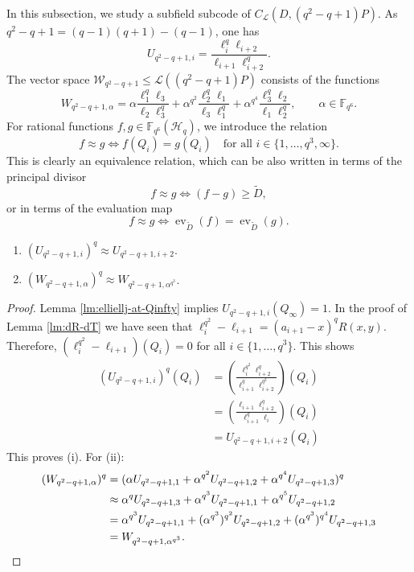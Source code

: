 \documentclass[entropy,article,submit,pdftex,moreauthors]{Definitions/mdpi}
\DeclareMathOperator{\ev}{ev}
\begin{document}
In this subsection, we study a subfield subcode of $C_\mathcal{L}(D,(q^2-q+1)P)$. As $q^2-q+1=(q-1)(q+1)-(q-1)$, one has
\[U_{q^2-q+1,i} = \frac{\ell_i^q\ell_{i+2}}{\ell_{i+1}\ell_{i+2}^q}.\]
The vector space $\mathcal{W}_{q^2-q+1}\leq \mathscr{L}((q^2-q+1)P)$ consists of the functions
\[W_{q^2-q+1,\alpha} = \alpha \frac{\ell_1^q\ell_3}{\ell_2\ell_3^q} + \alpha^{q^2} \frac{\ell_2^q\ell_1}{\ell_3\ell_1^q} + \alpha^{q^4} \frac{\ell_3^q\ell_2}{\ell_1\ell_2^q}, \qquad \alpha \in \mathbb{F}_{q^6}.\]
For rational functions $f,g\in \mathbb{F}_{q^6}(\mathscr{H}_q)$, we introduce the relation
\[f\approx g \Longleftrightarrow f(Q_i)=g(Q_i) \quad \text{for all $i \in \{1,\ldots,q^3,\infty\}$.}\]
This is clearly an equivalence relation, which can be also written in terms of the principal divisor
\[f\approx g \Longleftrightarrow (f-g) \geq \widetilde{D},\]
or in terms of the evaluation map
\[f\approx g \Longleftrightarrow \ev_{\widetilde{D}}(f) = \ev_{\widetilde{D}}(g).\]

\begin{Lemma} \label{lm:Uq-Wq}
\begin{enumerate}[label=(\roman*)]
\item $(U_{q^2-q+1,i})^q \approx U_{q^2-q+1,i+2}$.
\item $(W_{q^2-q+1,\alpha})^q \approx W_{q^2-q+1,\alpha^{q^3}}$.
\end{enumerate}
\end{Lemma}
\begin{proof}
Lemma \ref{lm:elliellj-at-Qinfty} implies $U_{q^2-q+1,i}(Q_\infty)=1$. In the proof of Lemma \ref{lm:dR-dT} we have seen that $\ell_i^{q^2} - \ell_{i+1}=(a_{i+1}-x)^qR(x,y)$. Therefore, $(\ell_i^{q^2} - \ell_{i+1})(Q_i)=0$ for all $i\in \{1,\ldots,q^3\}$. This shows 
\begin{align*}
(U_{q^2-q+1,i})^q(Q_i) &= \left(\frac{\ell_i^{q^2}\ell_{i+2}^q}{\ell_{i+1}^q\ell_{i+2}^{q^2}}\right)(Q_i)\\
&=\left(\frac{\ell_{i+1}\ell_{i+2}^q}{\ell_{i+1}^q\ell_{i}}\right)(Q_i)\\
&=U_{q^2-q+1,i+2}(Q_i)
\end{align*}
This proves (i). For (ii):
\begin{align*}
(W_{q^2-q+1,\alpha})^q &= (\alpha U_{q^2-q+1,1} + \alpha^{q^2} U_{q^2-q+1,2} + \alpha^{q^4} U_{q^2-q+1,3})^q \\
&\approx \alpha^q U_{q^2-q+1,3} + \alpha^{q^3} U_{q^2-q+1,1} + \alpha^{q^5} U_{q^2-q+1,2} \\
&=\alpha^{q^3} U_{q^2-q+1,1} + (\alpha^{q^3})^{q^2} U_{q^2-q+1,2} + (\alpha^{q^3})^{q^4} U_{q^2-q+1,3} \\
&=W_{q^2-q+1,\alpha^{q^3}}. \qedhere
\end{align*}
\end{proof}
\end{document}
